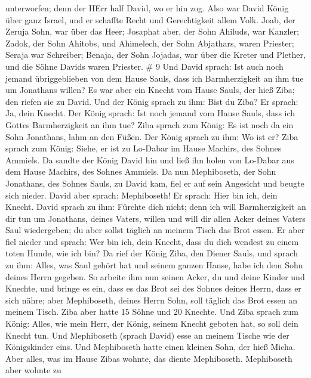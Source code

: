 unterworfen; denn der HErr half David, wo er hin zog.  Also
war David König über ganz Israel, und er schaffte Recht und
Gerechtigkeit allem Volk.  Joab, der Zeruja Sohn, war über
das Heer; Josaphat aber, der Sohn Ahiluds, war Kanzler; 
Zadok, der Sohn Ahitobs, und Ahimelech, der Sohn Abjathars, waren
Priester; Seraja war Schreiber;  Benaja, der Sohn Jojadas,
war über die Kreter und Plether, und die Söhne Davids waren Priester. \#
9  Und David sprach: Ist auch noch jemand übriggeblieben von
dem Hause Sauls, dass ich Barmherzigkeit an ihm tue um Jonathans willen?
 Es war aber ein Knecht vom Hause Sauls, der hieß Ziba; den
riefen sie zu David. Und der König sprach zu ihm: Bist du Ziba? Er
sprach: Ja, dein Knecht.  Der König sprach: Ist noch jemand
vom Hause Sauls, dass ich Gottes Barmherzigkeit an ihm tue? Ziba sprach
zum König: Es ist noch da ein Sohn Jonathans, lahm an den Füßen.
 Der König sprach zu ihm: Wo ist er? Ziba sprach zum König:
Siehe, er ist zu Lo-Dabar im Hause Machirs, des Sohnes Ammiels.
 Da sandte der König David hin und ließ ihn holen von
Lo-Dabar aus dem Hause Machirs, des Sohnes Ammiels.  Da nun
Mephiboseth, der Sohn Jonathans, des Sohnes Sauls, zu David kam, fiel er
auf sein Angesicht und beugte sich nieder. David aber sprach:
Mephiboseth! Er sprach: Hier bin ich, dein Knecht.  David
sprach zu ihm: Fürchte dich nicht; denn ich will Barmherzigkeit an dir
tun um Jonathans, deines Vaters, willen und will dir allen Acker deines
Vaters Saul wiedergeben; du aber sollst täglich an meinem Tisch das Brot
essen.  Er aber fiel nieder und sprach: Wer bin ich, dein
Knecht, dass du dich wendest zu einem toten Hunde, wie ich bin?
 Da rief der König Ziba, den Diener Sauls, und sprach zu
ihm: Alles, was Saul gehört hat und seinem ganzen Hause, habe ich dem
Sohn deines Herrn gegeben.  So arbeite ihm nun seinen
Acker, du und deine Kinder und Knechte, und bringe es ein, dass es das
Brot sei des Sohnes deines Herrn, dass er sich nähre; aber Mephiboseth,
deines Herrn Sohn, soll täglich das Brot essen an meinem Tisch. Ziba
aber hatte 15 Söhne und 20 Knechte.  Und Ziba sprach zum
König: Alles, wie mein Herr, der König, seinem Knecht geboten hat, so
soll dein Knecht tun. Und Mephiboseth (sprach David) esse an meinem
Tische wie der Königskinder eins.  Und Mephiboseth hatte
einen kleinen Sohn, der hieß Micha. Aber alles, was im Hause Zibas
wohnte, das diente Mephiboseth.  Mephiboseth aber wohnte zu
